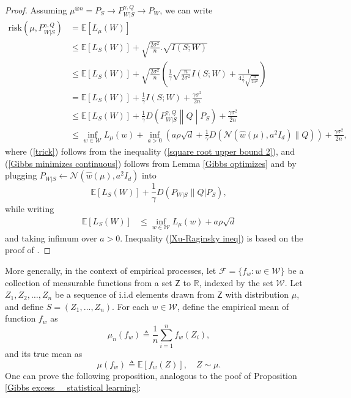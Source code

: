 \documentclass{article}
\newcommand{\E}{\mathbb{E}}
\newcommand{\risk}[0]{\mathrm{risk}}
\newcommand{\W}[0]{\mathcal{W}}
\begin{document}
\begin{proof}
	Assuming $\mu^{\otimes n}=P_S\to P_{W|S}^{\gamma, Q} \to P_W$, we can write 
	\begin{align}
		\risk\left(\mu, P_{W|S}^{\gamma, Q}\right)&=\E[L_{\mu}(W)] \nonumber\\
												 &\leq \E[L_S(W)]+\sqrt{\frac{2\sigma^2}{n}}.\sqrt{I(S;W)}\nonumber\\
												 &\leq \E[L_S(W)]+\sqrt{\frac{2\sigma^2}{n}}\left(\frac{1}{\gamma}\sqrt{\frac{n}{2\sigma^2}}I(S;W)+\frac{1}{4\frac{1}{\gamma} \sqrt{\frac{n}{2\sigma^2}}} \right)\label{trick}\\
												 &=\E[L_S(W)]+\frac{1}{\gamma}I(S;W)+\frac{\gamma\sigma^2}{2n}\nonumber\\
												 &\leq \E[L_S(W)]+\frac{1}{\gamma}D\left(P_{W|S}^{\gamma,Q}\middle\|Q\middle|P_S\right)+\frac{\gamma\sigma^2}{2n}\nonumber\\
												 &\leq \inf_{w\in\W} L_{\mu}(w)+
												 \inf_{a>0}\left(a\rho\sqrt{d} + \frac{1}{\gamma}D\left(\mathcal{N}(\widehat{w}(\mu), a^2I_d)\|Q \right) \right)+ \frac{\gamma\sigma^2}{2n}\label{Gibbs minimizes continuous},
	\end{align}
	where (\ref{trick}) follows from the inequality (\ref{square root upper bound 2}), 
 and (\ref{Gibbs minimizes continuous}) follows from Lemma \ref{Gibbs optimizes} and by plugging $P_{W|S}\gets \mathcal{N}\left(\widehat{w}(\mu),a^2I_d\right)$ into 
 \begin{equation}
 	\E[L_S(W)]+\frac{1}{\gamma}D(P_{W|S}\|Q|P_S),\nonumber
 \end{equation}
while writing
\begin{align}\label{Xu-Raginsky ineq}
    \E[L_S(W)]&\leq \inf_{w\in\W} L_{\mu}(w)+a\rho\sqrt{d}
\end{align}
and taking infimum over $a>0$. Inequality (\ref{Xu-Raginsky ineq}) is based on the proof of \cite[Corollary 3]{xu2017information}.
\end{proof}

More generally, in the context of empirical processes, let $\mathcal{F}=\{f_w: w\in \mathcal{W}\}$ be a collection of measurable functions from a set $\mathsf{Z}$ to $\mathbb{R}$, indexed by the set $\mathcal{W}$. Let $Z_1,Z_2,\dots, Z_n$ be a sequence of i.i.d elements drawn from $\mathsf{Z}$ with distribution $\mu$, and define $S=(Z_1,\dots,Z_n)$. For each $w\in\W$, define the empirical mean of function $f_w$ as 
\begin{equation}
	\mu_n(f_w)\triangleq \frac{1}{n}\sum_{i=1}^n f_w(Z_i), \nonumber
\end{equation}
and its true mean as 
\begin{equation}
	\mu(f_w)\triangleq \E \left[f_w(Z)\right],  \quad Z\sim \mu. \nonumber
\end{equation}
One can prove the following proposition, analogous to the poof of Proposition \ref{Gibbs excess _ statistical learning}:
\end{document}
